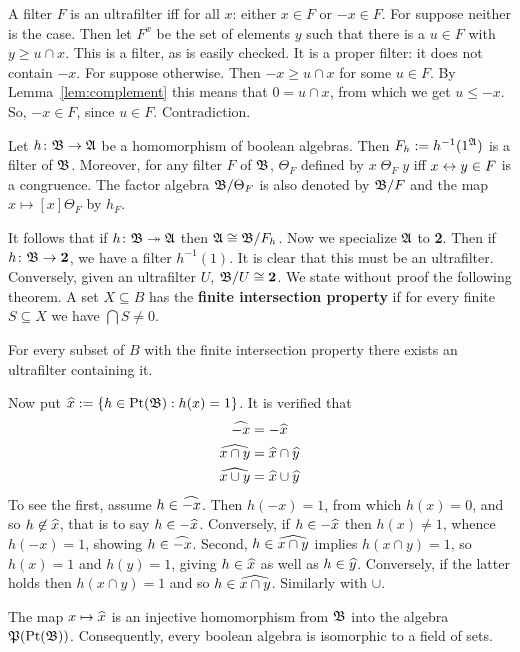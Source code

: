 A filter $F$ is an ultrafilter iff for all $x$: either
$x \in F$ or $-x \in F$. For suppose neither is the case. Then
let $F^x$ be the set of elements $y$ such that there is a
$u \in F$ with $y \geq u \cap x$. This is a filter, as is
easily checked. It is a proper filter: it does not contain
$-x$. For suppose otherwise. Then $-x \geq u \cap x$ for
some $u \in F$. By Lemma~\ref{lem:complement} this means that
$0 = u \cap x$, from which we get $u \leq -x$. So, $-x \in F$,
since $u \in F$. Contradiction.
\begin{prop}
Let $h \colon \mathfrak{B} \rightarrow \mathfrak{A}$ be a homomorphism of boolean algebras. Then
$F_h := h^{-1}(1^{\mathfrak{A}})$ is a filter of $\mathfrak{B}$. Moreover, for any
filter $F$ of $\mathfrak{B}$, $\Theta_F$ defined by $x\; \Theta_F\; y$ iff
$x \leftrightarrow y \in F$ is a congruence. The factor algebra
$\mathfrak{B}/\Theta_F$ is also denoted by $\mathfrak{B}/F$ and the map
$x \mapsto [x]{\Theta_F}$ by $h_F$.
\end{prop}
It follows that if $h \colon \mathfrak{B} \twoheadrightarrow \mathfrak{A}$ then $\mathfrak{A} \cong \mathfrak{B}/F_h$.
Now we specialize $\mathfrak{A}$ to \textbf{2}. Then if $h \colon \mathfrak{B} \rightarrow
\mathbf{2}$, we have a filter $h^{-1}(1)$. It is clear that
this must be an ultrafilter. Conversely, given an ultrafilter
$U$, $\mathfrak{B}/U \cong \mathbf{2}$. We state without proof the following
theorem. A set $X \subseteq B$ has the \textbf{finite intersection
property} if for every finite $S \subseteq X$ we have 
$\bigcap S \neq 0$.
\begin{thm}
\label{thm:fep}
For every subset of $B$ with the finite intersection property
there exists an ultrafilter containing it.
\end{thm}
Now put $\widehat{x} :=  \{h \in \operatorname{Pt}(\mathfrak{B}) : h(x) = 1\}$. It is verified that
\begin{align}
\notag
\widehat{-x} & = - \widehat{x} \\
\widehat{x \cap y} & = \widehat{x} \cap \widehat{y} \\
\notag
\widehat{x \cup y} & = \widehat{x} \cup \widehat{y}
\end{align}
To see the first, assume $h \in \widehat{-x}$. Then $h(-x) = 1$, from
which $h(x) = 0$, and so $h \not\in  \widehat{x}$, that is to say
$h \in - \widehat{x}$. Conversely, if $h \in - \widehat{x}$ then
$h(x) \neq 1$, whence $h(-x) = 1$, showing $h \in \widehat{-x}$.
Second, $h \in \widehat{x \cap y}$ implies $h(x \cap y) = 1$,
so $h(x) = 1$ and $h(y) = 1$, giving $h \in \widehat{x}$ as
well as $h \in \widehat{y}$.  Conversely, if the latter holds then
$h(x \cap y) = 1$ and so $h \in \widehat{x \cap y}$. Similarly with
$\cup$.
\begin{thm}
\label{thm:var}
The map $x \mapsto \widehat{x}$ is an injective homomorphism from $\mathfrak{B}$
into the algebra $\mathfrak{P}(\operatorname{Pt}(\mathfrak{B}))$. Consequently,
every boolean algebra is isomorphic to a field of sets.
\end{thm}
